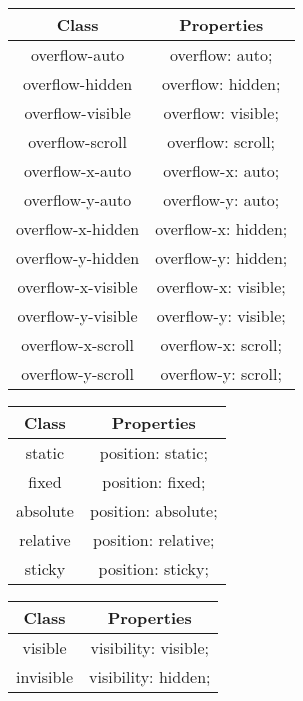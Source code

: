 \documentclass{report}
\begin{document}
    \pagebreak 
    \begin{center}
        \begin{tabular}{c|c}
            Class &Properties\\
            \hline
            overflow-auto	&overflow: auto;\\
            overflow-hidden	&overflow: hidden;\\
            overflow-visible	&overflow: visible;\\
            overflow-scroll	&overflow: scroll;\\
            overflow-x-auto	&overflow-x: auto;\\
            overflow-y-auto	&overflow-y: auto;\\
            overflow-x-hidden	&overflow-x: hidden;\\
            overflow-y-hidden	&overflow-y: hidden;\\
            overflow-x-visible	&overflow-x: visible;\\
            overflow-y-visible	&overflow-y: visible;\\
            overflow-x-scroll	&overflow-x: scroll;\\
            overflow-y-scroll	&overflow-y: scroll;
        \end{tabular}
    \end{center}

    \pagebreak 
    \begin{center}
        \begin{tabular}{c|c}
            Class &Properties \\
            \hline
            static	&position: static; \\
            fixed	&position: fixed; \\
            absolute	&position: absolute; \\
            relative	&position: relative; \\
            sticky	&position: sticky;
        \end{tabular}
    \end{center}

    
    \pagebreak 
    \begin{center}
        \begin{tabular}{c|c}
            Class & Properties\\
            \hline
            visible	&visibility: visible; \\
            invisible	&visibility: hidden;
        \end{tabular}
    \end{center}
\end{document}
